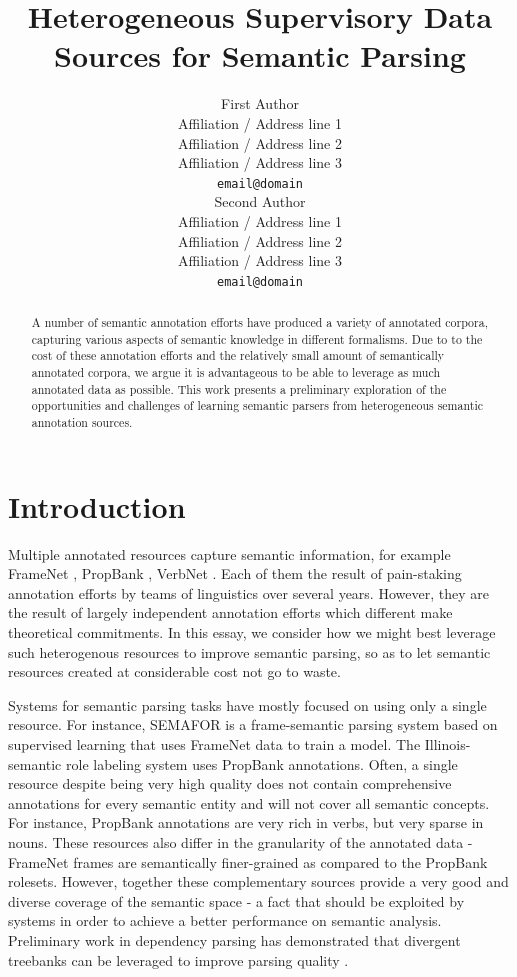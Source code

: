 \documentclass[11pt]{article}
\title{Heterogeneous Supervisory Data Sources for Semantic Parsing}
\author{First Author \\
  Affiliation / Address line 1 \\
  Affiliation / Address line 2 \\
  Affiliation / Address line 3 \\
  {\tt email@domain} \\\And
  Second Author \\
  Affiliation / Address line 1 \\
  Affiliation / Address line 2 \\
  Affiliation / Address line 3 \\
  {\tt email@domain} \\}
\date{}
\begin{document}
\maketitle
\begin{abstract}
A number of semantic annotation efforts have produced a variety of annotated corpora, capturing various aspects of semantic knowledge in different formalisms. Due to to the cost of these annotation efforts and the relatively small amount of semantically annotated corpora, we argue it is advantageous to be able to leverage as much annotated data as possible. This work presents a preliminary exploration of the opportunities and challenges of learning semantic parsers from heterogeneous semantic annotation sources. 
\end{abstract}

\section{Introduction}
Multiple annotated resources capture semantic information, for example FrameNet \cite{framenet}, PropBank \cite{propbank}, VerbNet \cite{vnet}. Each of them the result of pain-staking annotation efforts by teams of linguistics over several years. However, they are the result of largely independent annotation efforts which different make theoretical commitments. In this essay, we consider how we might best leverage such heterogenous resources to improve semantic parsing, so as to let semantic resources created at considerable cost not go to waste.

Systems for semantic parsing tasks have mostly focused on using only a single resource. For instance, SEMAFOR \cite{semafor} is a frame-semantic parsing system based on supervised learning that uses FrameNet data to train a model. The Illinois-semantic role labeling system \cite{illinoisSRL} uses PropBank annotations. Often, a single resource despite being very high quality does not contain comprehensive annotations for every semantic entity and will not cover all semantic concepts. For instance, PropBank annotations are very rich in verbs, but very sparse in nouns. These resources also differ in the granularity of the annotated data - FrameNet frames are semantically finer-grained as compared to the PropBank rolesets. However, together these complementary sources provide a very good and diverse coverage of the semantic space - a fact that should be exploited by systems in order to achieve a better performance on semantic analysis. Preliminary work in dependency parsing has demonstrated that divergent treebanks can be leveraged to improve parsing quality \cite{zhou:2013}.
\end{document}

